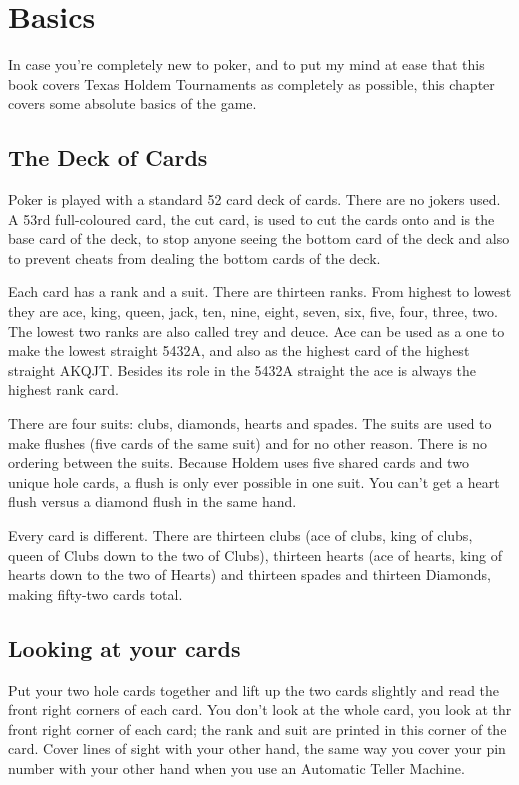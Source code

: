 \chapter{Basics}

In case you're completely new to poker, and to put my mind at ease
that this book covers Texas Holdem Tournaments as completely as
possible, this chapter covers some absolute basics of the game.

\section{The Deck of Cards}

Poker is played with a standard 52 card deck of cards. There are no
jokers used. A 53rd full-coloured card, the cut card, is used to cut
the cards onto and is the base card of the deck, to stop anyone
seeing the bottom card of the deck and also to prevent cheats from
dealing the bottom cards of the deck.

Each card has a rank and a suit. There are thirteen ranks. From
highest to lowest they are ace, king, queen, jack, ten, nine, eight,
seven, six, five, four, three, two. The lowest two ranks are also
called trey and deuce. Ace can be used as a one to make
the lowest straight 5432A, and also as the highest card of the highest
straight AKQJT. Besides its role in the 5432A straight the ace is
always the highest rank card.

There are four suits: clubs, diamonds, hearts and spades. The suits
are used to make flushes (five cards of the same suit) and for no
other reason. There is no ordering between the suits. Because
Holdem uses five shared cards and two unique hole cards, a flush is
only ever possible in one suit. You can't get a heart flush versus a
diamond flush in the same hand.

Every card is different. There are thirteen clubs (ace of clubs, king
of clubs, queen of Clubs down to the two of Clubs), thirteen hearts
(ace of hearts, king of hearts down to the two of Hearts) and
thirteen spades and thirteen Diamonds, making fifty-two cards total.

\section{Looking at your cards}

Put your two hole cards together and lift up the two cards slightly
and read the front right corners of each card. You don't look at the
whole card, you look at thr front right corner of each card; the rank
and suit are printed in this corner of the card. Cover lines of sight
with your other hand, the same way you cover your pin number with your
other hand when you use an Automatic Teller Machine.

